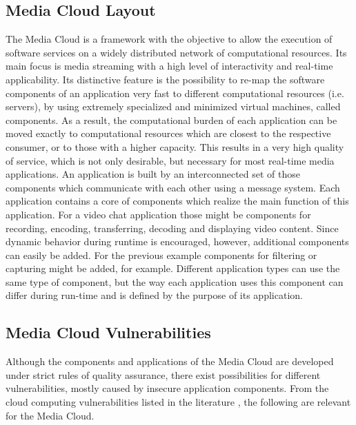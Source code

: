 \documentclass{llncs}
\begin{document}
\subsection{Media Cloud Layout}

The Media Cloud is a framework with the objective to allow the execution of software services on a widely distributed network of computational resources. Its main focus is media streaming with a high level of interactivity and real-time applicability. Its distinctive feature
is the possibility to re-map the software components of an application very fast to different computational resources (i.e. servers), by using extremely specialized and minimized virtual machines, called components. As a result, the computational burden of each application can be moved exactly to computational resources which are closest to the respective consumer, or to those with
a higher capacity. This results in a very high quality of service, which is not only desirable, but necessary for most real-time media applications. An application is built by an interconnected set of those components which communicate with each other using a message system. Each application contains a core of components which realize the main function of this application. For a video chat application those might be components for recording, encoding, transferring, decoding and displaying video content. Since dynamic behavior during runtime is encouraged, however, additional components can easily be added. For the previous example components for filtering or capturing might be added, for example. Different application types can use the same type of component, but the way each application uses this component can differ during run-time and is defined by the purpose of its application. 

\subsection{Media Cloud Vulnerabilities}
\label{sec:mediacloudvulnerabilities}
Although the components and applications of the Media Cloud are developed under strict rules of quality assurance, there exist possibilities for different vulnerabilities, mostly caused by insecure application components. From the cloud computing vulnerabilities listed in the literature \cite{CSA13.2,VelZla11,MatKumLat09}, the following are relevant for the Media Cloud. 
\end{document}
